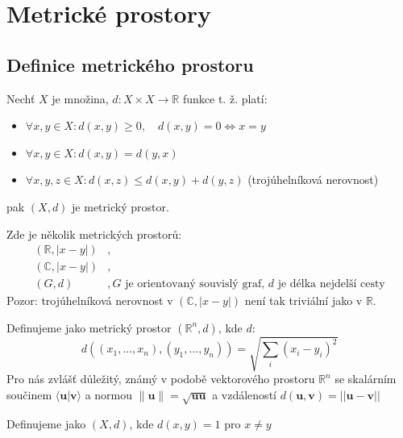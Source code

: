 \documentclass[../main.tex]{subfiles}
\begin{document}
\section{Metrické prostory}
\subsection{Definice metrického prostoru}

\begin{definition}
	Nechť $X$ je množina,  $d: X \times X \rightarrow \mathbb{R}$ funkce t. ž. platí:
	
	\begin{itemize}
	\item{$\forall x,y \in X : d(x,y) \geq 0, \quad d(x,y) = 0 \iff x = y$ }
	\item{$\forall x,y \in X : d(x,y) = d(y,x)$}
	\item{$\forall x,y,z \in X : d(x,z) \leq d(x,y) + d(y,z)$ (trojúhelníková nerovnost)}
	\end{itemize}
	pak $(X,d)$ je metrický prostor.
\end{definition}

\begin{example}
	Zde je několik metrických prostorů:
	\begin{align*} 
	    (\mathbb{R}, |x-y|) &,\\
	    (\mathbb{C},|x-y|) &,\\
	    (G,d) &, G \text{ je orientovaný souvislý graf, } d \text{ je délka nejdelší cesty}
	\end{align*}%
	Pozor: trojúhelníková nerovnost v $(\mathbb{C}, |x-y|)$ není tak triviální jako v $\mathbb{R}$.
\end{example}

\begin{definition}
Definujeme jako metrický prostor $(\mathbb{R}^n,d)$, kde $d$:
\[d((x_1,...,x_n),(y_1,...,y_n)) = \sqrt{\sum_i(x_i-y_i)^2}\]
Pro nás zvlášť důležitý, známý v podobě vektorového prostoru $\mathbb{R}^n$ se skalárním součinem $\langle \textbf{u} | \textbf{v} \rangle$ a normou
$\|\textbf{u}\| = \sqrt{\textbf{uu}}$ a vzdáleností $d(\textbf{u},\textbf{v}) = ||\textbf{u}-\textbf{v} ||$
\end{definition}

\begin{definition}
	Definujeme jako $(X,d)$, kde $d(x,y) = 1$ pro $x \neq y$
\end{definition}
\end{document}
